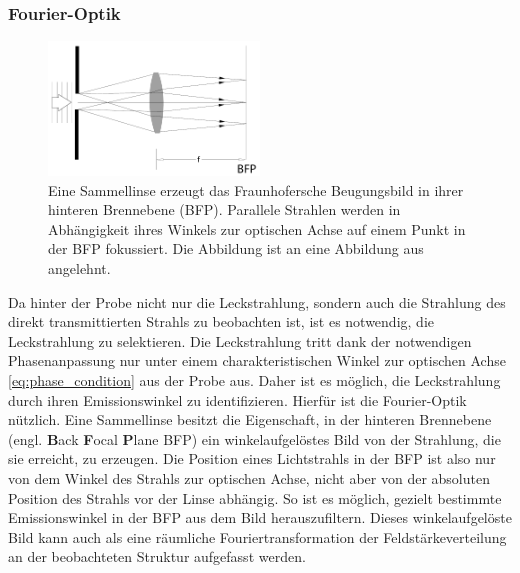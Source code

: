 \documentclass[titlepage,  ngerman]{article}
\begin{document}
	\subsubsection{Fourier-Optik}
	\label{sec:fourier}
	\begin{figure}[h] 
		\centering
		\includegraphics[width=0.5\textwidth]{figures/FourierLinse.pdf}
		\caption[Fourieroptik]{Eine Sammellinse erzeugt das Fraunhofersche Beugungsbild in ihrer hinteren Brennebene (BFP). Parallele Strahlen werden in Abhängigkeit ihres Winkels zur optischen Achse auf einem Punkt in der BFP fokussiert. Die Abbildung ist an eine Abbildung aus \cite{Hecht.2018} angelehnt.}
		\label{fig:FourierLinse}
	\end{figure}
	Da hinter der Probe nicht nur die Leckstrahlung, sondern auch die Strahlung des direkt transmittierten Strahls zu beobachten ist, ist es notwendig, die Leckstrahlung zu selektieren. Die Leckstrahlung tritt dank der notwendigen Phasenanpassung nur unter einem charakteristischen Winkel zur optischen Achse \eqref{eq:phase_condition} aus der Probe aus. Daher ist es möglich, die Leckstrahlung durch ihren Emissionswinkel zu identifizieren. Hierfür ist die Fourier-Optik nützlich. Eine Sammellinse besitzt die Eigenschaft, in  der hinteren Brennebene (engl. \textbf{B}ack \textbf{F}ocal \textbf{P}lane BFP) ein winkelaufgelöstes Bild von der Strahlung, die sie erreicht, zu erzeugen\cite{Hecht.1996}. Die Position eines Lichtstrahls in der BFP ist also nur von dem Winkel des Strahls zur optischen Achse, nicht aber von der absoluten Position des Strahls vor der Linse abhängig. So ist es möglich, gezielt bestimmte Emissionswinkel in der BFP aus dem Bild herauszufiltern. Dieses winkelaufgelöste Bild kann auch als eine räumliche Fouriertransformation der Feldstärkeverteilung an der beobachteten Struktur aufgefasst werden. 
	
\end{document}

